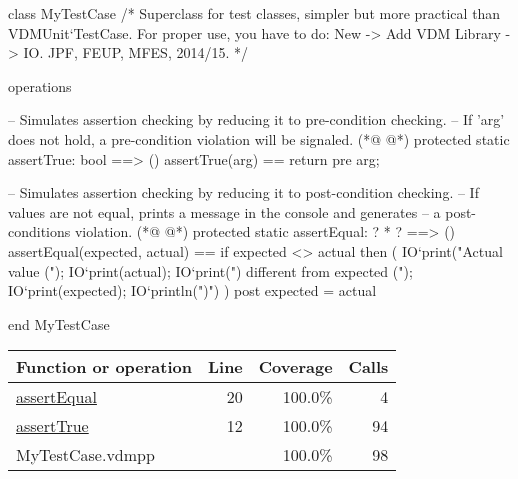 \begin{vdmpp}[breaklines=true]
class MyTestCase
/*
  Superclass for test classes, simpler but more practical than VDMUnit`TestCase. 
  For proper use, you have to do: New -> Add VDM Library -> IO.
  JPF, FEUP, MFES, 2014/15.
*/

operations

 -- Simulates assertion checking by reducing it to pre-condition checking.
 -- If 'arg' does not hold, a pre-condition violation will be signaled.
(*@
\label{assertTrue:12}
@*)
 protected static assertTrue: bool ==> ()
 assertTrue(arg) == 
  return 
 pre arg;
  
 -- Simulates assertion checking by reducing it to post-condition checking.
 -- If values are not equal, prints a message in the console and generates 
 -- a post-conditions violation.
(*@
\label{assertEqual:20}
@*)
 protected static assertEqual: ? * ? ==> ()
 assertEqual(expected, actual) == 
  if expected <> actual then (
     IO`print("Actual value (");
     IO`print(actual); 
     IO`print(") different from expected (");
     IO`print(expected);
     IO`println(")\n")
  )
 post expected = actual
  
end MyTestCase
\end{vdmpp}
\bigskip
\begin{longtable}{|l|r|r|r|}
\hline
Function or operation & Line & Coverage & Calls \\
\hline
\hline
\hyperref[assertEqual:20]{assertEqual} & 20&100.0\% & 4 \\
\hline
\hyperref[assertTrue:12]{assertTrue} & 12&100.0\% & 94 \\
\hline
\hline
MyTestCase.vdmpp & & 100.0\% & 98 \\
\hline
\end{longtable}

